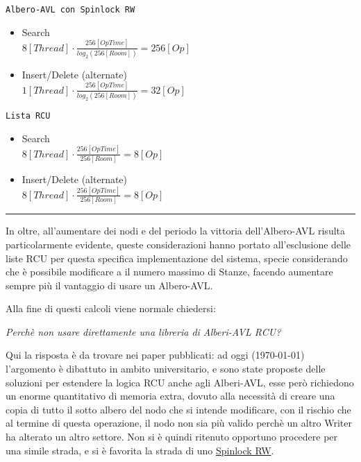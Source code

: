 \begin{minipage}{0.45\linewidth}
\begin{center}
\texttt{Albero-AVL con Spinlock RW}
\end{center}
\begin{itemize}
 \item[\faSmileO] Search \\
 $8 [Thread] \cdot \frac{256 [OpTime]}{log_2(256 [Room])} = 256 [Op]$

 \item[\faSmileO] Insert/Delete (alternate) \\
 $1 [Thread] \cdot \frac{256 [OpTime]}{log_2(256 [Room])} = 32 [Op]$
\end{itemize}
\end{minipage}
\hfill
\begin{minipage}{0.45\linewidth}
\begin{center}
\texttt{Lista RCU}
\end{center}
\begin{itemize}
 \item[\faFrownO] Search\\
  $8 [Thread] \cdot \frac{256 [OpTime]}{256 [Room]} = 8 [Op]$
 \item[\faFrownO] Insert/Delete (alternate) \\
  $8 [Thread] \cdot \frac{256 [OpTime]}{256 [Room]} = 8 [Op]$
\end{itemize}
\end{minipage}

\rule{\linewidth}{0.5pt}

In oltre, all'aumentare dei nodi e del periodo la vittoria dell'Albero-AVL risulta particolarmente evidente, queste
considerazioni hanno portato all'esclusione delle liste RCU per questa specifica implementazione del sistema, specie
considerando che è possibile modificare a \RunTime il numero massimo di Stanze, facendo aumentare sempre più il
vantaggio di usare un Albero-AVL.

Alla fine di questi calcoli viene normale chiedersi:

\begin{center}
\textit{Perchè non usare direttamente una libreria di Alberi-AVL RCU?}
\end{center}

Qui la risposta è da trovare nei paper pubblicati: ad oggi (\today) l'argomento è dibattuto in ambito universitario, e
sono state proposte delle soluzioni per estendere la logica RCU anche agli Alberi-AVL, esse però richiedono un enorme
quantitativo di memoria extra, dovuto alla necessità di creare una copia di tutto il sotto albero del nodo che si
intende modificare, con il rischio che al termine di questa operazione, il nodo non sia più valido perchè un altro
Writer ha alterato un altro settore. Non si è quindi ritenuto opportuno procedere per una simile strada, e si è
favorita la strada di uno \underline{Spinlock RW}.

